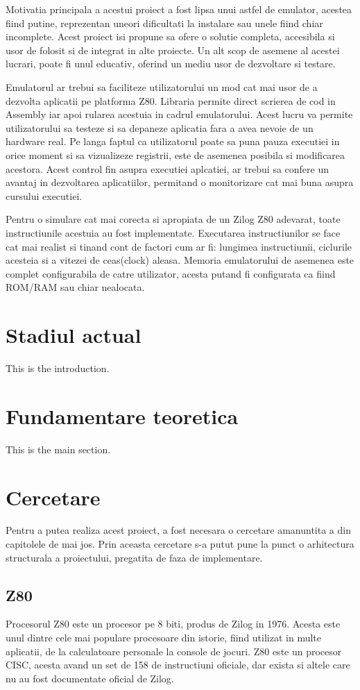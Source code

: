\documentclass[titlepage]{article}
\begin{document}
Motivatia principala a acestui proiect a fost lipsa unui astfel de emulator, acestea fiind putine, reprezentan uneori dificultati la instalare sau unele fiind chiar incomplete.
Acest proiect isi propune sa ofere o solutie completa, accesibila si usor de folosit si de integrat in alte proiecte. Un alt scop de asemene al acestei lucrari, poate fi unul educativ, oferind un mediu usor de dezvoltare si testare.

Emulatorul ar trebui sa faciliteze utilizatorului un mod cat mai usor de a dezvolta aplicatii pe platforma Z80.
Libraria permite direct scrierea de cod in Assembly iar apoi rularea acestuia in cadrul emulatorului. Acest lucru va permite utilizatorului sa testeze si sa depaneze aplicatia fara a avea nevoie de un hardware real.
Pe langa faptul ca utilizatorul poate sa puna pauza executiei in orice moment si sa vizualizeze registrii, este de asemenea posibila si modificarea acestora.
Acest control fin asupra executiei aplcatiei, ar trebui sa confere un avantaj in dezvoltarea aplicatiilor, permitand o monitorizare cat mai buna asupra cursului executiei.

Pentru o simulare cat mai corecta si apropiata de un Zilog Z80 adevarat, toate instructiunile acestuia au fost implementate. 
Executarea instructiunilor se face cat mai realist si tinand cont de factori cum ar fi: lungimea instructiunii, ciclurile acesteia si a vitezei de ceas(clock) aleasa.
Memoria emulatorului de asemenea este complet configurabila de catre utilizator, acesta putand fi configurata ca fiind ROM/RAM sau chiar nealocata.


\section{Stadiul actual}
This is the introduction.

\section{Fundamentare teoretica}
This is the main section.

\section{Cercetare}
Pentru a putea realiza acest proiect, a fost necesara o cercetare amanuntita a din capitolele de mai jos.
Prin aceasta cercetare s-a putut pune la punct o arhitectura structurala a proiectului, pregatita de faza de implementare.

\subsection{\ac {Z80}}
Procesorul Z80 este un procesor pe 8 biti, produs de Zilog in 1976. Acesta este unul dintre cele mai populare procesoare din istorie, fiind utilizat in multe aplicatii, de la calculatoare personale la console de jocuri.
\ac {Z80} este un procesor CISC, acesta avand un set de 158 de instructiuni oficiale, dar exista si altele care nu au fost documentate oficial de Zilog.
\end{document}
